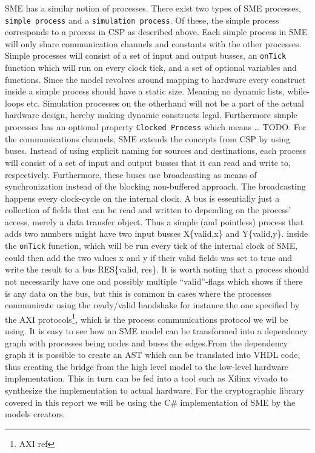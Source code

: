 \documentclass[a4paper]{article}
\begin{document}
SME has a similar notion of processes. There exist two types of SME processes, \texttt{simple process} and a \texttt{simulation process}. Of these, the simple process corresponds to a process in CSP as described above. Each simple process in SME will only share communication channels and constants with the other processes. Simple processes will consist of a set of input and output busses, an \texttt{onTick} function which will run on every clock tick, and a set of optional variables and functions. Since the model revolves around mapping to hardware every construct inside a simple process should have a static size. Meaning no dynamic lists, while-loops etc. Simulation processes on the otherhand will not be a part of the actual hardware design, hereby making dynamic constructs legal. Furthermore simple processes has an optional property \texttt{Clocked Process} which means \ldots{} TODO.
For the communications channels, SME extends the concepts from CSP by using buses. Instead of using explicit naming for sources and destinations, each process will consist of a set of input and output busses that it can read and write to, respectively. Furthermore, these buses use broadcasting as means of synchronization instead of the blocking non-buffered approach.  The broadcasting happens every clock-cycle on the internal clock.
A bus is essentially just a collection of fields that can be read and written to depending on the process' access, merely a data transfer object. Thus a simple (and pointless) process that adds two numbers might have two input busses X\{valid,x\} and Y\{valid,y\}. inside the \texttt{onTick} function, which will be run every tick of the internal clock of SME, could then add the two values x and y if their valid fields was set to true and write the result to a bus RES\{valid, res\}. It is worth noting that a process should not necessarily have one and possibly multiple ``valid''-flags which shows if there is any data on the bus, but this is common in cases where the processes communicate using the ready/valid handshake for instance the one specified by the AXI protocols\footnote{AXI ref}, which is the process communications protocol we wil be using. It is easy to see how an SME model can be transformed into a dependency graph with processes being nodes and buses the edges.From the dependency graph it is possible to create an AST which can be translated into VHDL code\cite{SME}, thus creating the bridge from the high level model to the low-level hardware implementation. This in turn can be fed into a tool such as Xilinx vivado to synthesize the implementation to actual hardware. For the cryptographic library covered in this report we will be using the C\# implementation of SME by the models creators\cite{SME}.
\end{document}
